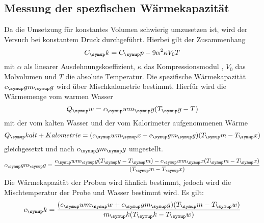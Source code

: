 \subsection{Messung der spezfischen Wärmekapazität}
Da die Umsetzung für konstantes Volumen schwierig umzusetzen ist, wird der
Versuch bei konstantem Druck durchgeführt. Hierbei gilt der Zusammenhang
\begin{equation}
  C_\su{k} = C_\su{p}-9\alpha^2\kappa V_0T
  \label{eq:mol}
\end{equation}
mit $\alpha$ als linearer Ausdehnungskoeffizient, $\kappa$ das Kompressionsmodul
, $V_0$ das Molvolumen und $T$ die absolute Temperatur. Die spezifische
Wärmekapazität $c_\su{g}m_\su{g}$ wird über Mischkalometrie bestimmt.
Hierfür wird die Wärmemenge vom warmen Wasser
\begin{equation}
  Q_\su{w}=c_\su{w}m_\su{y}(T_\su{y}-T)
\end{equation}
mit der vom kalten Wasser und der vom Kalorimeter aufgenommenen Wärme
\begin{equation}
  Q_\su{kalt+Kalometrie}=(c_\su{w}m_\su{x}+c_\su{g}m_\su{g})(T_\su{m}-T_\su{x})
\end{equation}
gleichgesetzt und nach $c_\su{g}m_\su{g}$ umgestellt.
\begin{equation}
  c_\su{g}m_\su{g}=\frac{c_\su{w}m_\su{y}(T_\su{y}-T_\su{m})-c_\su{w}m_\su{x}
  (T_\su{m}-T_\su{x})}{(T_\su{m}-T_\su{x})}
  \label{eq:kalo}
\end{equation}
Die Wärmekapazität der Proben wird ähnlich bestimmt, jedoch wird die
Mischtemperatur der Probe und Wasser bestimmt wird. Es gilt:
\begin{equation}
  c_\su{k}=\frac{(c_\su{w}m_\su{w}+c_\su{g}m_\su{g})(T_\su{m}-T_\su{w})}
  {m_\su{k}(T_\su{k}-T_\su{w})}
  \label{eq:probe}
\end{equation}

